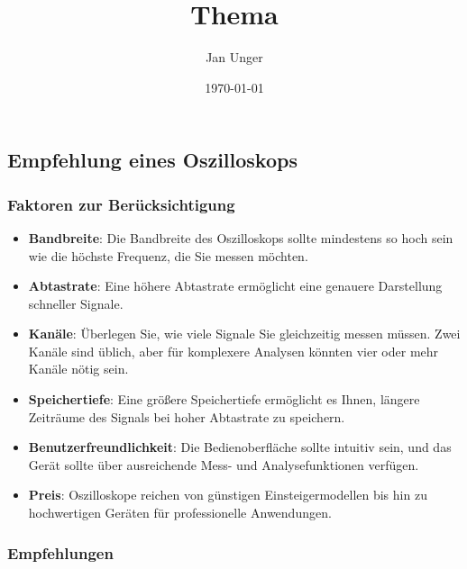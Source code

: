 \documentclass{vorlage-design-main}
\title{Thema}
\author{Jan Unger}
\date{\today}
\begin{document}
\maketitle

\begin{abstract}

\end{abstract}

\hypertarget{empfehlung-eines-oszilloskops}{%
\subsection{Empfehlung eines
Oszilloskops}\label{empfehlung-eines-oszilloskops}}

\hypertarget{faktoren-zur-beruxfccksichtigung}{%
\subsubsection{Faktoren zur
Berücksichtigung}\label{faktoren-zur-beruecksichtigung}}

\begin{itemize}

\item
  \textbf{Bandbreite}: Die Bandbreite des Oszilloskops sollte mindestens
  so hoch sein wie die höchste Frequenz, die Sie messen möchten.
\item
  \textbf{Abtastrate}: Eine höhere Abtastrate ermöglicht eine genauere
  Darstellung schneller Signale.
\item
  \textbf{Kanäle}: Überlegen Sie, wie viele Signale Sie gleichzeitig
  messen müssen. Zwei Kanäle sind üblich, aber für komplexere Analysen
  könnten vier oder mehr Kanäle nötig sein.
\item
  \textbf{Speichertiefe}: Eine größere Speichertiefe ermöglicht es
  Ihnen, längere Zeiträume des Signals bei hoher Abtastrate zu
  speichern.
\item
  \textbf{Benutzerfreundlichkeit}: Die Bedienoberfläche sollte intuitiv
  sein, und das Gerät sollte über ausreichende Mess- und
  Analysefunktionen verfügen.
\item
  \textbf{Preis}: Oszilloskope reichen von günstigen Einsteigermodellen
  bis hin zu hochwertigen Geräten für professionelle Anwendungen.
\end{itemize}

\hypertarget{empfehlungen}{%
\subsubsection{Empfehlungen}\label{empfehlungen}}
\end{document}
